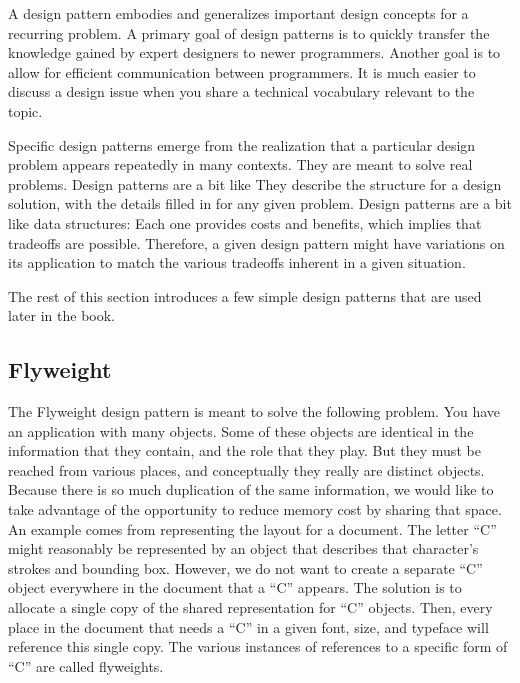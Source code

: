 A design pattern embodies and generalizes important design concepts
for a recurring problem.
A primary goal of design patterns is to quickly transfer the knowledge
gained by expert designers to newer programmers.
Another goal is to allow for efficient communication between
programmers.
It is much easier to discuss a design issue when you share a
technical vocabulary relevant to the topic.

Specific design patterns emerge from the realization that a particular
design problem appears repeatedly in many contexts.
They are meant to solve real problems.
Design patterns are a bit
like 
They describe the structure for a design solution, with the details
filled in for any given problem.
Design patterns are a bit like data structures:
Each one provides costs and benefits, which implies that tradeoffs are
possible.
Therefore, a given design pattern might have variations on its
application to match the various tradeoffs inherent in a given
situation.

The rest of this section introduces a few simple design patterns that
are used later in the book.

\subsection{Flyweight}
\label{FlyweightPatt}

The Flyweight design pattern is meant to solve the following problem.
You have an application with many objects.
Some of these objects are identical in the information that
they contain, and the role that they play.
But they must be reached from various places, and conceptually they
really are distinct objects.
Because there is so much duplication of the same information,
we would like to take advantage of the opportunity to reduce memory
cost by sharing that space. 
An example comes from representing the layout for a document.
The letter ``C'' might reasonably be represented by an object that
describes that character's strokes and bounding box.
However, we do not want to create a separate ``C'' object everywhere
in the document that a ``C'' appears.
The solution is to allocate a single copy of the shared representation
for ``C'' objects.
Then, every place in the document that needs a ``C'' in a given font,
size, and typeface will reference this single copy.
The various instances of references to a specific form of ``C'' are
called flyweights.


